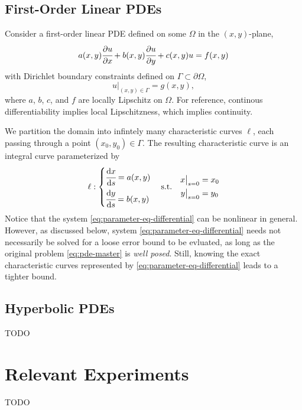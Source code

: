 \documentclass{article}
\newcommand{\px}[1]{\cfrac{\partial #1}{\partial x}}
\newcommand{\py}[1]{\cfrac{\partial #1}{\partial y}}
\newcommand{\ds}[1]{\cfrac{\mathrm{d} #1}{\mathrm{d} s}}
\begin{document}
\subsection{First-Order Linear PDEs}
Consider a first-order linear PDE defined on some $\Omega$ in the $(x, y)$-plane,
\begin{equation}\label{eq:pde-master}
    a(x, y) \px{u} + b(x, y) \py{u} + c(x, y)u = f(x, y)
\end{equation}
with Dirichlet boundary constraints defined on $\Gamma \subset \partial \Omega$,
\begin{equation}\label{eq:pde-bc-master}
    u\Big|_{(x, y) \in \Gamma} = g(x, y),
\end{equation}
where $a$, $b$, $c$, and $f$ are locally Lipschitz on $\Omega$. For reference, continous differentiability implies local Lipschitzness, which implies continuity.

We partition the domain into infintely many characteristic curves $\ell$, each passing through a point $(x_0, y_0) \in \Gamma$. The resulting characteristic curve is an integral curve parameterized by
\begin{equation} \label{eq:parameter-eq-differential}
    \ell: \begin{cases*}
        \ds{x} = a(x, y) \\
        \ds{y} = b(x, y) 
    \end{cases*} 
    \quad 
    \text{s.t.} 
    \quad
    \begin{aligned}
        x\big|_{s=0} &= x_0 \\
        y\big|_{s=0} &= y_0
    \end{aligned}
\end{equation}
Notice that the system \ref{eq:parameter-eq-differential} can be nonlinear in general. 
However, as discussed below, system \ref{eq:parameter-eq-differential} needs not necessarily be solved for a loose error bound to be evluated, as long as the original problem \ref{eq:pde-master} is \textit{well posed}. 
Still, knowing the exact characteristic curves represented by \ref{eq:parameter-eq-differential} leads to a tighter bound.

\subsection{Hyperbolic PDEs}
TODO

\section{Relevant Experiments}\label{section:experiments}
TODO
\end{document}
